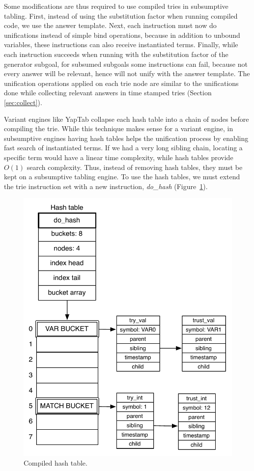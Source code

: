 Some modifications are thus required to use compiled tries in subsumptive tabling. First,
instead of using the substitution factor when running compiled code, we use the answer template.
Next, each instruction must now do unifications instead of simple bind operations,
because in addition to unbound variables, these instructions can also receive instantiated terms.
Finally, while each instruction succeeds when running with the substitution factor of the generator
subgoal, for subsumed subgoals some instructions can fail, because not every answer will be relevant,
hence will not unify with the answer template. The unification operations applied on each trie node
are similar to the unifications done while collecting relevant answers in time stamped tries
(Section \ref{sec:collect}).

Variant engines like YapTab collapse each hash table into a chain of nodes before compiling
the trie. While this technique makes sense for a variant engine, in subsumptive engines
having hash tables helps the unification process by enabling fast search of instantiated terms.
If we had a very long sibling chain, locating a specific term would have a linear time complexity, while
hash tables provide $O(1)$ search complexity.
Thus, instead of removing hash tables, they must be kept on a subsumptive tabling engine.
To use the hash tables, we must extend the trie instruction set with a new instruction,
\textit{do\_hash} (Figure~\ref{fig:compiled_hash}).

\begin{figure}[h]
  \centering
    \includegraphics[scale=0.6]{compiled_hash.pdf}
  \caption{Compiled hash table.}
  \label{fig:compiled_hash}
\end{figure}

